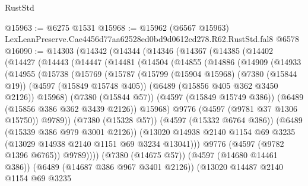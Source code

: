 \begin{lexlean}{RustStd}
\begin{coremodule}
@15963 := @6275 @1531
@15968 := @15962
    (@6567 @15963)
    LexLeanPreserve.Cae4456d77aa62528ed0bd9d0612cd278.R62.RustStd.fal8
    @6578
@16090 := @14303
    (@14342
      (@14344
        (@14346
          (@14367
            (@14385
              (@14402
                (@14427
                  (@14443
                    (@14447
                      (@14481
                        (@14504
                          (@14855
                            (@14886
                              (@14909
                                (@14933
                                  (@14955
                                    (@15738
                                      (@15769
                                        (@15787
                                          (@15799
                                            (@15904 @15968)
                                            (@7380 (@15844 @19))
                                            (@4597 (@15849 @15748 @405))
                                            (@6489 (@15856 @405 @362 @3450 @2126))
                                            @15968)
                                          (@7380 (@15844 @57))
                                          (@4597 (@15849 @15749 @386))
                                          (@6489 (@15856 @386 @362 @3439 @2126))
                                          @15968)
                                        @9776
                                        (@4597 (@9781 @37 @1306 @15750))
                                        @9789))
                                    (@7380 (@15328 @57))
                                    (@4597 (@15332 @6764 @386))
                                    (@6489 (@15339 @386 @979 @3001 @2126))
                                    (@13020
                                      @14938
                                      @2140
                                      @1154
                                      @69
                                      @3235
                                      (@13029 @14938 @2140 @1151 @69 @3234 @13041)))
                                  @9776
                                  (@4597 (@9782 @1396 @6765))
                                  @9789))))
                          (@7380 (@14675 @57))
                          (@4597 (@14680 @14461 @386))
                          (@6489 (@14687 @386 @967 @3401 @2126))
                          (@13020
                            @14487
                            @2140
                            @1154
                            @69
                            @3235

\end{coremodule}
\end{lexlean}
